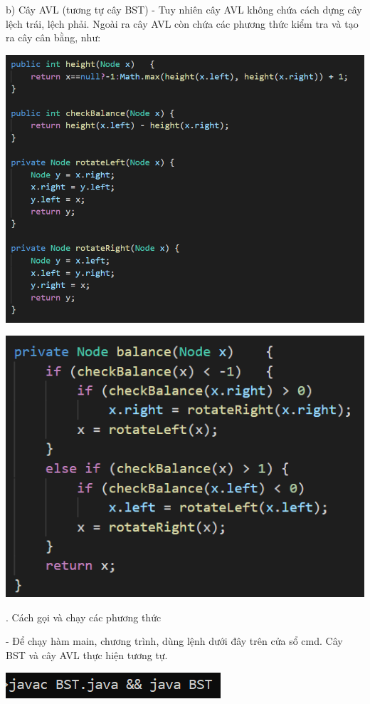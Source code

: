 \documentclass{report}
\begin{document}
\bigskip
b) Cây AVL (tương tự cây BST)
- Tuy nhiên cây AVL không chứa cách dựng cây lệch trái, lệch phải. Ngoài ra cây AVL còn chứa các phương thức kiểm tra và tạo ra cây cân bằng, như:
\begin{center}
     \includegraphics[scale=0.8]{o}
    \end{center}
\begin{center}
     \includegraphics[scale=1]{p}
    \end{center}


. Cách gọi và chạy các phương thức

- Để chạy hàm main, chương trình, dùng lệnh dưới đây trên cửa sổ cmd. Cây BST và cây AVL thực hiện tương tự.

\begin{center}
     \includegraphics[scale=1]{q}
    \end{center}
\end{document}
